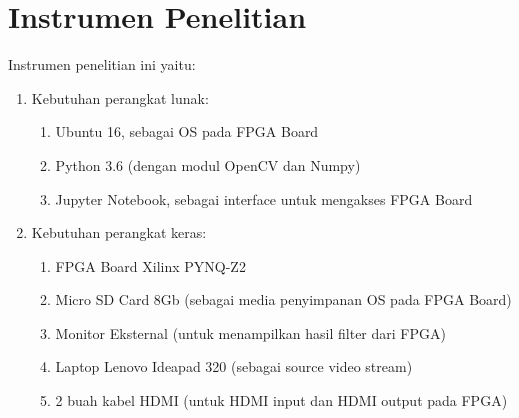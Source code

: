 \section{Instrumen Penelitian}
Instrumen penelitian ini yaitu:
\begin{enumerate}[topsep=0pt,itemsep=0pt,partopsep=0pt, parsep=0pt]
    \item Kebutuhan perangkat lunak:
    \begin{enumerate}[topsep=0pt,itemsep=0pt,partopsep=0pt, parsep=0pt, label=\textbf{\alph*.}]
        \item Ubuntu 16, sebagai OS pada FPGA Board
        \item Python 3.6 (dengan modul OpenCV dan Numpy)
        \item Jupyter Notebook, sebagai interface untuk mengakses FPGA Board 
    \end{enumerate}
    \item Kebutuhan perangkat keras:
    \begin{enumerate}[topsep=0pt,itemsep=0pt,partopsep=0pt, parsep=0pt, label=\textbf{\alph*.}]
        \item FPGA Board Xilinx PYNQ-Z2
        \item Micro SD Card 8Gb (sebagai media penyimpanan OS pada FPGA Board)
        \item Monitor Eksternal (untuk menampilkan hasil filter dari FPGA)
        \item Laptop Lenovo Ideapad 320 (sebagai source video stream)
        \item 2 buah kabel HDMI (untuk HDMI input dan HDMI output pada FPGA) 
    \end{enumerate}
\end{enumerate}
